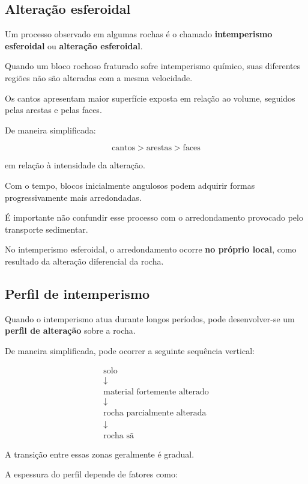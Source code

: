 \documentclass[a4paper,12pt]{article}
\theoremstyle{definition}
\theoremstyle{definition}
\theoremstyle{definition}
\begin{document}
\subsection{Alteração esferoidal}

Um processo observado em algumas rochas é o chamado \textbf{intemperismo esferoidal} ou \textbf{alteração esferoidal}.

Quando um bloco rochoso fraturado sofre intemperismo químico, suas diferentes regiões não são alteradas com a mesma velocidade.

Os cantos apresentam maior superfície exposta em relação ao volume, seguidos pelas arestas e pelas faces.

De maneira simplificada:

\[
\text{cantos}
>
\text{arestas}
>
\text{faces}
\]

em relação à intensidade da alteração.

Com o tempo, blocos inicialmente angulosos podem adquirir formas progressivamente mais arredondadas.

É importante não confundir esse processo com o arredondamento provocado pelo transporte sedimentar.

No intemperismo esferoidal, o arredondamento ocorre \textbf{no próprio local}, como resultado da alteração diferencial da rocha.

\subsection{Perfil de intemperismo}

Quando o intemperismo atua durante longos períodos, pode desenvolver-se um \textbf{perfil de alteração} sobre a rocha.

De maneira simplificada, pode ocorrer a seguinte sequência vertical:

\[
\begin{array}{c}
\text{solo} \\[4pt]
\downarrow \\[4pt]
\text{material fortemente alterado} \\[4pt]
\downarrow \\[4pt]
\text{rocha parcialmente alterada} \\[4pt]
\downarrow \\[4pt]
\text{rocha sã}
\end{array}
\]

A transição entre essas zonas geralmente é gradual.

A espessura do perfil depende de fatores como:
\end{document}
